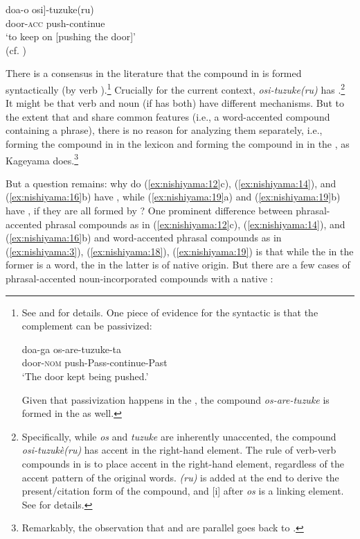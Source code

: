 \documentclass[output=paper]{LSP/langsci}
\begin{document}
\ea\label{ex:nishiyama:21}
\gll  {\ob}doa-o    osi]-tuzuke(ru)\\
    door-\textsc{acc}  push-continue\\
\glt ‘to keep on [pushing the door]’\\
\glend (cf. \citealt{Kageyama1989verbverb,Kageyama1993,Nishiyama2008,Fukuda2012})
\z



There is a consensus in the literature that the compound in  is formed syntactically (by verb ).\footnote{See \citet{Kageyama1989verbverb} and \citet{Nishiyama2008} for details. One piece of evidence for the syntactic  is that the complement can be passivized:

\ea\label{ex:nishiyama:fn10}
\gll doa-ga    os-are-tuzuke-ta    \\
door-\textsc{nom} push-Pass-continue-Past\\
\glt `The door kept being pushed.’
\z


Given that passivization happens in the , the compound \textit{os-are-tuzuke} is formed in the  as well.} Crucially for the current context, \textit{osi-tuzuke(ru)} has .\footnote{Specifically, while \textit{os} and \textit{tuzuke} are inherently unaccented, the compound \textit{osi-tuzukè(ru)} has accent in the right-hand element. The  rule of verb-verb compounds in  is to place accent in the right-hand element, regardless of the accent pattern of the original words. \textit{(ru)} is added at the end to derive the present/citation form of the compound, and [i] after \textit{os} is a linking element. See \citet{Nishiyama2016} for details.} It might be that verb  and noun  (if  has both) have different mechanisms. But to the extent that  and  share common features (i.e., a word-accented compound containing a phrase), there is no reason for analyzing them separately, i.e., forming the compound in  in the lexicon and forming the compound in  in the , as Kageyama does.\footnote{Remarkably, the observation that  and  are parallel goes back to \citet[114]{Sakakura1952}.}

But a question remains: why do (\ref{ex:nishiyama:12}c), (\ref{ex:nishiyama:14}), and (\ref{ex:nishiyama:16}b) have , while (\ref{ex:nishiyama:19}a) and (\ref{ex:nishiyama:19}b) have , if they are all formed by ? One prominent difference between phrasal-accented phrasal compounds as in (\ref{ex:nishiyama:12}c), (\ref{ex:nishiyama:14}), and (\ref{ex:nishiyama:16}b) and word-accented phrasal compounds as in (\ref{ex:nishiyama:3}), (\ref{ex:nishiyama:18}), (\ref{ex:nishiyama:19}) is that while the  in the former is a  word, the  in the latter is of native origin. But there are a few cases of phrasal-accented noun-incorporated compounds with a native :
\end{document}
